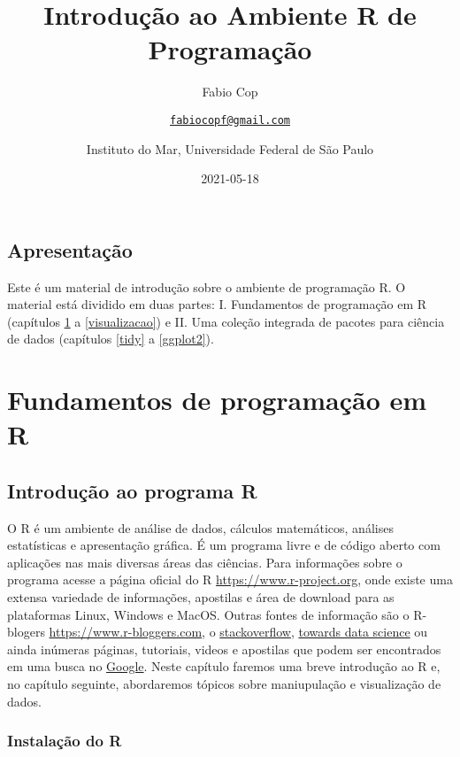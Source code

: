 \documentclass[
]{book}
\title{Introdução ao Ambiente R de Programação}
\author{Fabio Cop \and \href{mailto:fabiocopf@gmail.com}{\nolinkurl{fabiocopf@gmail.com}} \and Instituto do Mar, Universidade Federal de São Paulo}
\date{2021-05-18}
\begin{document}
\maketitle

{
\setcounter{tocdepth}{1}
\tableofcontents
}
\hypertarget{apresentauxe7uxe3o}{%
\chapter*{Apresentação}\label{apresentauxe7uxe3o}}

Este é um material de introdução sobre o ambiente de programação R. O material está dividido em duas partes: I. Fundamentos de programação em R (capítulos \ref{intro} a \ref{visualizacao}) e II. Uma coleção integrada de pacotes para ciência de dados (capítulos \ref{tidy} a \ref{ggplot2}).

\hypertarget{part-fundamentos-de-programauxe7uxe3o-em-r}{%
\part{Fundamentos de programação em R}\label{part-fundamentos-de-programauxe7uxe3o-em-r}}

\hypertarget{intro}{%
\chapter{Introdução ao programa R}\label{intro}}

O R é um ambiente de análise de dados, cálculos matemáticos, análises estatísticas e apresentação gráfica. É um programa livre e de código aberto com aplicações nas mais diversas áreas das ciências. Para informações sobre o programa acesse a página oficial do R \href{https://www.r-project.org/}{https://www.r-project.org}, onde existe uma extensa variedade de informações, apostilas e área de download para as plataformas Linux, Windows e MacOS. Outras fontes de informação são o R-blogers \href{https://www.r-bloggers.com/}{https://www.r-bloggers.com}, o \href{https://pt.stackoverflow.com/}{stackoverflow}, \href{https://towardsdatascience.com/}{towards data science} ou ainda inúmeras páginas, tutoriais, videos e apostilas que podem ser encontrados em uma busca no \href{https://www.google.com.br/}{Google}. Neste capítulo faremos uma breve introdução ao R e, no capítulo seguinte, abordaremos tópicos sobre maniupulação e visualização de dados.

\hypertarget{instalauxe7uxe3o-do-r}{%
\section{Instalação do R}\label{instalauxe7uxe3o-do-r}}
\end{document}
